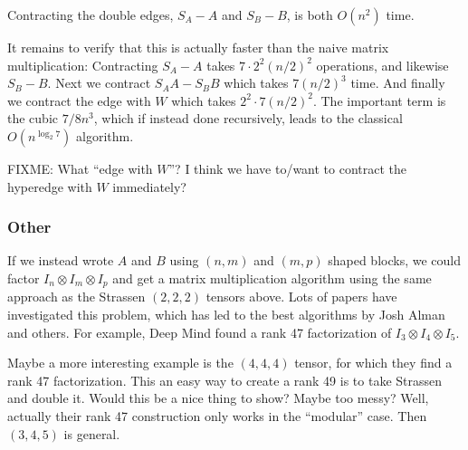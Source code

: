 \newpage

Contracting the double edges, $S_A - A$ and $S_B - B$, is both $O(n^2)$ time.

It remains to verify that this is actually faster than the naive matrix multiplication:
Contracting $S_A - A$ takes $7\cdot 2^2 (n/2)^2$ operations, and likewise $S_B - B$.
Next we contract $S_AA - S_BB$ which takes $7(n/2)^3$ time.
And finally we contract the edge with $W$ which takes $2^2 \cdot 7 (n/2)^2$.
The important term is the cubic $7/8 n^3$, which if instead done recursively, leads to the classical $O(n^{\log_2 7})$ algorithm.

FIXME: What ``edge with $W$''? I think we have to/want to contract the hyperedge with $W$ immediately?

\subsubsection{Other}

If we instead wrote $A$ and $B$ using $(n,m)$ and $(m,p)$ shaped blocks, we could factor $I_n\otimes I_m\otimes I_p$ and get a matrix multiplication algorithm using the same approach as the Strassen $(2,2,2)$ tensors above.
Lots of papers have investigated this problem, which has led to the best algorithms by Josh Alman and others.
For example, Deep Mind found a rank 47 factorization of $I_3\otimes I_4\otimes I_5$.

Maybe a more interesting example is the $(4,4,4)$ tensor, for which they find a rank 47 factorization.
This an easy way to create a rank 49 is to take Strassen and double it.
Would this be a nice thing to show? Maybe too messy?
Well, actually their rank 47 construction only works in the ``modular'' case. Then $(3,4,5)$ is general.


